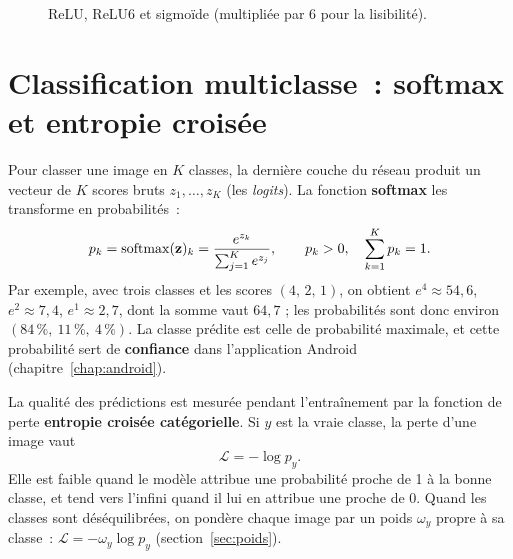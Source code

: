 \begin{figure}[H]
\centering
{}
\caption{ReLU, ReLU6 et sigmoïde (multipliée par 6 pour la lisibilité).}\label{fig:activations}
\end{figure}

\section{Classification multiclasse~: softmax et entropie croisée}

Pour classer une image en $K$ classes, la dernière couche du réseau produit un vecteur de $K$ scores bruts $z_1,\dots,z_K$ (les \emph{logits}). La fonction \textbf{softmax} les transforme en probabilités~:
\begin{equation}
  p_k = \operatorname{softmax}(\mathbf{z})_k = \frac{e^{z_k}}{\sum_{j=1}^{K} e^{z_j}}, \qquad p_k>0,\quad \sum_{k=1}^{K} p_k = 1.
\end{equation}
Par exemple, avec trois classes et les scores $(4,\,2,\,1)$, on obtient $e^4\approx 54{,}6$, $e^2\approx 7{,}4$, $e^1\approx 2{,}7$, dont la somme vaut $64{,}7$ ; les probabilités sont donc environ $(84\,\%,\ 11\,\%,\ 4\,\%)$. La classe prédite est celle de probabilité maximale, et cette probabilité sert de \textbf{confiance} dans l’application Android (chapitre~\ref{chap:android}).

La qualité des prédictions est mesurée pendant l’entraînement par la fonction de perte \textbf{entropie croisée catégorielle}. Si $y$ est la vraie classe, la perte d’une image vaut
\begin{equation}
  \mathcal{L} = -\log p_{y}.
\end{equation}
Elle est faible quand le modèle attribue une probabilité proche de 1 à la bonne classe, et tend vers l’infini quand il lui en attribue une proche de 0. Quand les classes sont déséquilibrées, on pondère chaque image par un poids $\omega_y$ propre à sa classe~: $\mathcal{L}=-\omega_y\log p_y$ (section~\ref{sec:poids}).


